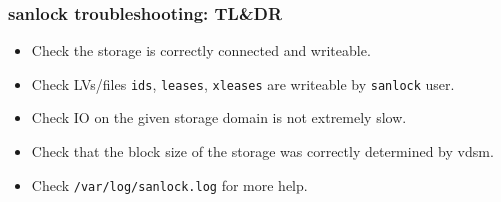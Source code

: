 \documentclass[10pt,utf8]{beamer}
\begin{document}
% 

\begin{frame}
    \frametitle{sanlock troubleshooting: TL\&DR}
        \begin{itemize}
            \item Check the storage is correctly connected and writeable.
            \item Check LVs/files \texttt{ids}, \texttt{leases}, \texttt{xleases} are writeable by \texttt{sanlock} user.
            \item Check IO on the given storage domain is not extremely slow.
            \item Check that the block size of the storage was correctly determined by vdsm.
            \item Check \texttt{/var/log/sanlock.log} for more help.
        \end{itemize}
\end{frame}
\end{document}
